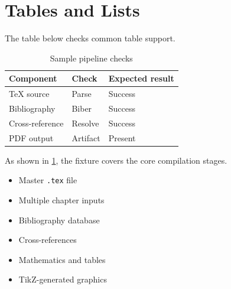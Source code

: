 \section{Tables and Lists}\label{sec:data}
The table below checks common table support.

\begin{table}[htbp]
\centering
\caption{Sample pipeline checks}
\label{tab:checks}
\begin{tabular}{lll}
\toprule
Component & Check & Expected result \\
\midrule
TeX source & Parse & Success \\
Bibliography & Biber & Success \\
Cross-reference & Resolve & Success \\
PDF output & Artifact & Present \\
\bottomrule
\end{tabular}
\end{table}

As shown in \cref{tab:checks}, the fixture covers the core compilation stages.

\begin{itemize}
  \item Master \texttt{.tex} file
  \item Multiple chapter inputs
  \item Bibliography database
  \item Cross-references
  \item Mathematics and tables
  \item TikZ-generated graphics
\end{itemize}
